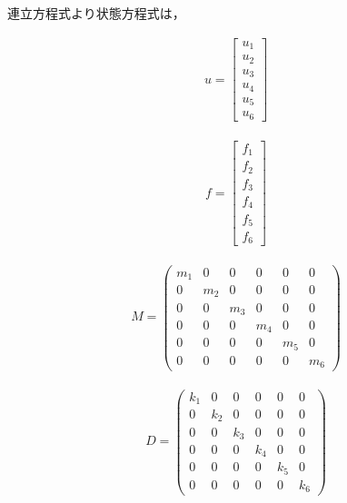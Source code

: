 連立方程式より状態方程式は，

\begin{eqnarray}
    u = 
    \begin{bmatrix}
        u_1 \\
        u_2 \\
        u_3 \\
        u_4 \\
        u_5 \\
        u_6 
    \end{bmatrix}
\end{eqnarray}

\begin{eqnarray}
    f = 
    \begin{bmatrix}
        f_1 \\
        f_2 \\
        f_3 \\
        f_4 \\
        f_5 \\
        f_6 
    \end{bmatrix}
\end{eqnarray}

\begin{eqnarray}
    M = 
    \left(\begin{matrix}
        m_1 & 0   & 0   & 0   & 0   & 0   \\
        0   & m_2 & 0   & 0   & 0   & 0   \\
        0   & 0   & m_3 & 0   & 0   & 0   \\
        0   & 0   & 0   & m_4 & 0   & 0   \\
        0   & 0   & 0   & 0   & m_5 & 0   \\
        0   & 0   & 0   & 0   & 0   & m_6 
    \end{matrix}\right)
\end{eqnarray}

\begin{eqnarray}
    D =
    \left(\begin{matrix}
        k_1 & 0   & 0   & 0   & 0   & 0    \\
        0   & k_2 & 0   & 0   & 0   & 0    \\
        0   & 0   & k_3 & 0   & 0   & 0    \\
        0   & 0   & 0   & k_4 & 0   & 0    \\
        0   & 0   & 0   & 0   & k_5 & 0    \\
        0   & 0   & 0   & 0   & 0   & k_6  
    \end{matrix}\right)
\end{eqnarray}

